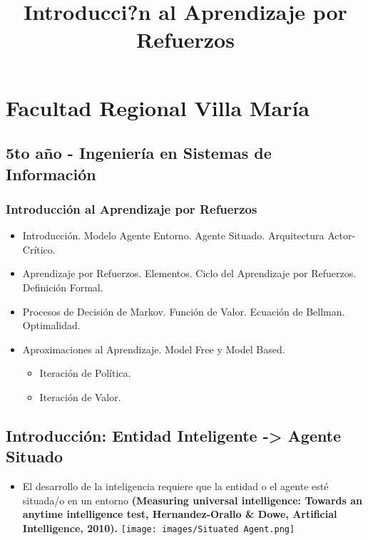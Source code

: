 \documentclass[11pt]{article}
\title{Introducci?n al Aprendizaje por Refuerzos}
\makeatletter
\def\maxwidth{\ifdim\Gin@nat@width>\linewidth\linewidth
    \else\Gin@nat@width\fi}
\let\Oldincludegraphics\includegraphics
\renewcommand{\includegraphics}[1]{\Oldincludegraphics[width=.8\maxwidth]{#1}}
\providecommand{\tightlist}{%
      \setlength{\itemsep}{0pt}\setlength{\parskip}{0pt}}
\makeatother
\begin{document}
    
    
    \maketitle
    
    

    
    \section{Facultad Regional Villa
María}\label{facultad-regional-villa-maruxeda}

\subsection{5to año - Ingeniería en Sistemas de
Información}\label{to-auxf1o---ingenieruxeda-en-sistemas-de-informaciuxf3n}

\subsubsection{Introducción al Aprendizaje por
Refuerzos}\label{introducciuxf3n-al-aprendizaje-por-refuerzos}

\begin{itemize}
\tightlist
\item
  Introducción. Modelo Agente Entorno. Agente Situado. Arquitectura
  Actor-Crítico.
\item
  Aprendizaje por Refuerzos. Elementos. Ciclo del Aprendizaje por
  Refuerzos. Definición Formal.
\item
  Procesos de Decisión de Markov. Función de Valor. Ecuación de Bellman.
  Optimalidad.
\item
  Aproximaciones al Aprendizaje. Model Free y Model Based.

  \begin{itemize}
  \tightlist
  \item
    Iteración de Política.
  \item
    Iteración de Valor.
  \end{itemize}
\end{itemize}

    \subsection{Introducción: Entidad Inteligente -\textgreater{} Agente
Situado}\label{introducciuxf3n-entidad-inteligente---agente-situado}

\begin{itemize}
\tightlist
\item
  El desarrollo de la inteligencia requiere que la entidad o el agente
  esté situada/o en un entorno \textbf{(Measuring universal
  intelligence: Towards an anytime intelligence test, Hernandez-Orallo
  \& Dowe, Artificial Intelligence, 2010).}
  \texttt{[image: images/Situated Agent.png]}
\end{itemize}
\end{document}

